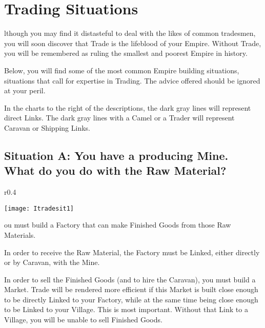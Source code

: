 \section{\textsf{Trading Situations}}


lthough you may find it distasteful to deal with the likes of common tradesmen, you will soon discover that Trade is the lifeblood of your Empire. Without Trade, you will be remembered as ruling the smallest and poorest Empire in history.

Below, you will find some of the most common Empire building situations, situations that call for expertise in Trading. The advice offered should be ignored at your peril.

In the charts to the right of the descriptions, the dark gray lines will represent direct Links. The dark gray lines with a Camel or a Trader will represent Caravan or Shipping Links.


\subsection{\textsf{Situation A: You have a producing Mine. What do you do with the Raw Material?}}

\begin{wrapfigure}{r}{0.4\textwidth}
    \vspace{-20pt}
    \begin{center}
        \texttt{[image: Itradesit1]} %
    \end{center}
    \vspace{-20pt}
\end{wrapfigure}

ou must build a Factory that can make Finished Goods from those Raw Materials.

In order to receive the Raw Material, the Factory must be Linked, either directly or by Caravan, with the Mine.


In order to sell the Finished Goods (and to hire the Caravan), you must build a Market. Trade will be rendered more efficient if this Market is built close enough to be directly Linked to your Factory, while at the same time being close enough to be Linked to your Village. This is most important. Without that Link to a Village, you will be unable to sell Finished Goods.


